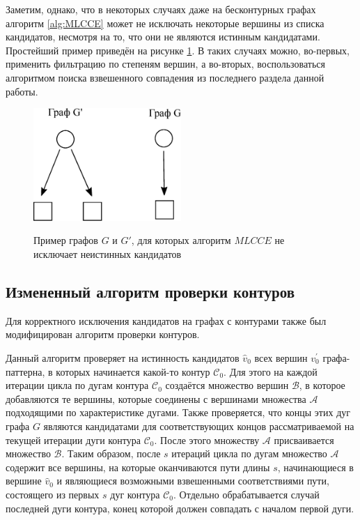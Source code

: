 Заметим, однако, что в некоторых случаях даже на бесконтурных графах алгоритм \ref{alg:MLCCE} может не исключать некоторые вершины из списка кандидатов, несмотря на то, что они не являются истинным кандидатами. Простейший пример приведён на рисунке \ref{fig:fail}. В таких случаях можно, во-первых, применить фильтрацию по степеням вершин, а во-вторых, воспользоваться алгоритмом поиска взвешенного совпадения из последнего раздела данной работы.

\begin{figure}[H]
	\caption{Пример графов $G$ и $G'$, для которых алгоритм $MLCCE$ не исключает неистинных кандидатов}
	\centering
	\includegraphics[width=0.5\textwidth]{failgraphs}
	\label{fig:fail}
\end{figure}

\subsection{Измененный алгоритм проверки контуров}

Для корректного исключения кандидатов на графах с контурами также был модифицирован алгоритм проверки контуров. 

Данный алгоритм проверяет на истинность кандидатов $\widehat{v}_0$ всех вершин $v_0^{\prime}$ графа-паттерна, в которых начинается какой-то контур $\mathcal{C}_0$. Для этого на каждой итерации цикла по дугам контура $\mathcal{C}_0$ создаётся множество вершин $\mathcal{B}$, в которое добавляются те вершины, которые соединены с вершинами множества $\mathcal{A}$ подходящими по характеристике дугами. Также проверяется, что концы этих дуг графа $G$ являются кандидатами для соответствующих концов рассматриваемой на текущей итерации дуги контура $\mathcal{C}_0$. После этого множеству $\mathcal{A}$ присваивается множество $\mathcal{B}$. Таким образом, после $s$ итераций цикла по дугам множество $\mathcal{A}$ содержит все вершины, на которые оканчиваются пути длины $s$, начинающиеся в вершине $\widehat{v}_0$ и являющиеся возможными взвешенными соответствиями пути, состоящего из первых $s$ дуг контура $\mathcal{C}_0$. Отдельно обрабатывается случай последней дуги контура, конец которой должен совпадать с началом первой дуги.

